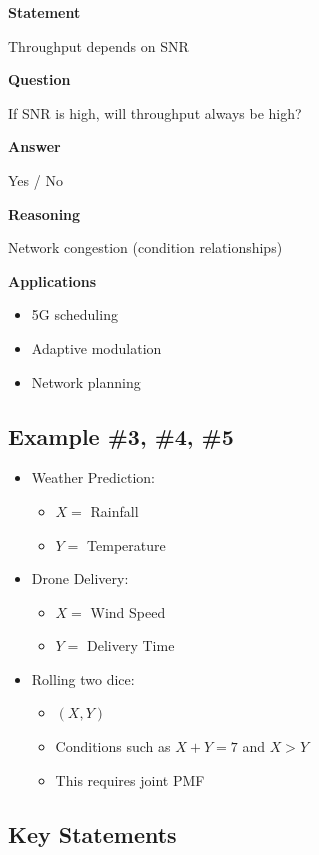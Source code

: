 \documentclass[12pt]{article}
\begin{document}
\textbf{Statement}

Throughput depends on SNR

\textbf{Question}

If SNR is high, will throughput always be high?

\textbf{Answer}

Yes / No

\textbf{Reasoning}

Network congestion (condition relationships)

\textbf{Applications}

\begin{itemize}
\item 5G scheduling
\item Adaptive modulation
\item Network planning
\end{itemize}

\subsection{Example \#3, \#4, \#5}

\begin{itemize}
\item Weather Prediction:
\begin{itemize}
\item $X =$ Rainfall
\item $Y =$ Temperature
\end{itemize}
\item Drone Delivery:
\begin{itemize}
\item $X =$ Wind Speed
\item $Y =$ Delivery Time
\end{itemize}
\item Rolling two dice:
\begin{itemize}
\item $(X,Y)$
\item Conditions such as $X + Y = 7$ and $X > Y$
\item This requires joint PMF
\end{itemize}
\end{itemize}

\subsection{Key Statements}
\end{document}

